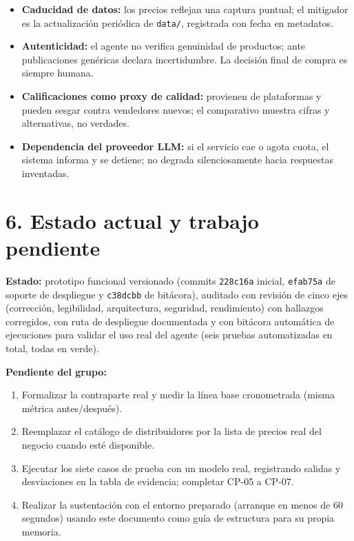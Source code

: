 \documentclass[11pt,letterpaper]{article}
\begin{document}
\begin{itemize}[leftmargin=*,itemsep=2pt]
\item \textbf{Caducidad de datos:} los precios reflejan una captura puntual; el mitigador es la
actualización periódica de \texttt{data/}, registrada con fecha en metadatos.
\item \textbf{Autenticidad:} el agente no verifica genuinidad de productos; ante publicaciones
genéricas declara incertidumbre. La decisión final de compra es siempre humana.
\item \textbf{Calificaciones como proxy de calidad:} provienen de plataformas y pueden sesgar contra
vendedores nuevos; el comparativo muestra cifras y alternativas, no verdades.
\item \textbf{Dependencia del proveedor LLM:} si el servicio cae o agota cuota, el sistema informa y
se detiene; no degrada silenciosamente hacia respuestas inventadas.
\end{itemize}

\section*{6. Estado actual y trabajo pendiente}

\textbf{Estado:} prototipo funcional versionado (commits \texttt{228c16a} inicial, \texttt{efab75a}
de soporte de despliegue y \texttt{c38dcbb} de bitácora), auditado con revisión de cinco ejes
(corrección, legibilidad, arquitectura, seguridad, rendimiento) con hallazgos corregidos, con ruta de
despliegue documentada y con bitácora automática de ejecuciones para validar el uso real del agente
(seis pruebas automatizadas en total, todas en verde).

\textbf{Pendiente del grupo:}
\begin{enumerate}[leftmargin=*,itemsep=2pt]
\item Formalizar la contraparte real y medir la línea base cronometrada (misma métrica antes/después).
\item Reemplazar el catálogo de distribuidores por la lista de precios real del negocio cuando esté disponible.
\item Ejecutar los siete casos de prueba con un modelo real, registrando salidas y desviaciones en la
tabla de evidencia; completar CP-05 a CP-07.
\item Realizar la sustentación con el entorno preparado (arranque en menos de 60 segundos) usando este
documento como guía de estructura para su propia memoria.
\end{enumerate}
\end{document}
